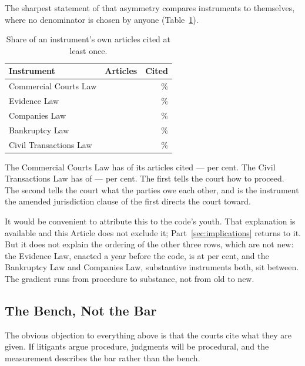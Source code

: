 \documentclass[12pt]{article}
\begin{document}
The sharpest statement of that asymmetry compares instruments to themselves,
where no denominator is chosen by anyone (Table~\ref{tab:instruments}).

\begin{table}[t]
\centering
\singlespacing
\caption{Share of an instrument's own articles cited at least once.}
\label{tab:instruments}
\begin{tabular}{lrr}
\toprule
Instrument & Articles & Cited \\
\midrule
Commercial Courts Law   & \nCCLArticles{}   & \nCCLShare{}\% \\
Evidence Law            & \nEvidenceArticles{}   & \nEvidenceShare{}\% \\
Companies Law           & \nCompaniesArticles{}  & \nCompaniesShare{}\% \\
Bankruptcy Law          & \nBankruptcyArticles{} & \nBankruptcyShare{}\% \\
Civil Transactions Law  & \nCivilArticles{} & \nCivilShare{}\% \\
\bottomrule
\end{tabular}
\end{table}

The Commercial Courts Law has \nCCLCited{} of its \nCCLArticles{} articles
cited --- \nCCLShare{} per cent. The Civil Transactions Law has
\nCivilCited{} of \nCivilArticles{} --- \nCivilShare{} per cent. The first
tells the court how to proceed. The second tells the court what the parties
owe each other, and is the instrument the amended jurisdiction clause of the
first directs the court toward.

It would be convenient to attribute this to the code's youth. That
explanation is available and this Article does not exclude it;
Part~\ref{sec:implications} returns to it. But it does not explain the ordering of the other three rows, which
are not new: the Evidence Law, enacted a year before the code, is at
\nEvidenceShare{} per cent, and the Bankruptcy Law and Companies Law,
substantive instruments both, sit between. The gradient runs from procedure
to substance, not from old to new.

\subsection{The Bench, Not the Bar}
\label{sub:bench}

The obvious objection to everything above is that the courts cite what they
are given. If litigants argue procedure, judgments will be procedural, and the
measurement describes the bar rather than the bench.
\end{document}
